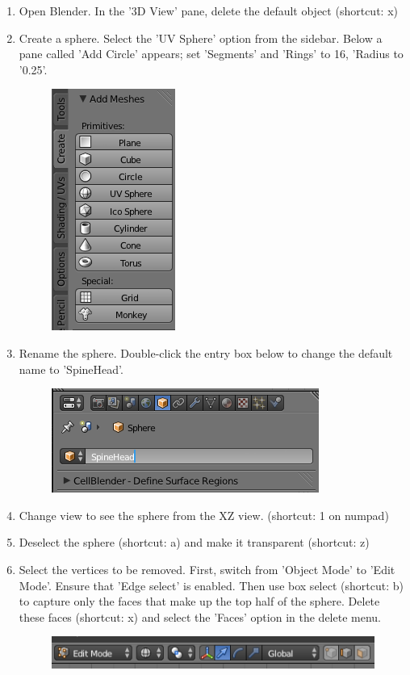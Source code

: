 \documentclass[twoside,a4paper]{refart}
\begin{document}
\begin{enumerate}

\item   Open Blender. In the '3D View' pane, delete the default object (shortcut: x)
    
\item   Create a sphere. Select the 'UV Sphere' option from the sidebar. Below a pane called 'Add Circle' appears; set 'Segments' and 'Rings' to 16, 'Radius to '0.25'. 
        \begin{figure}[H]
        \includegraphics[scale=0.5]{spinehead1.png}
        \end{figure}

\item   Rename the sphere. Double-click the entry box below to change the default name to 'SpineHead'.
        \begin{figure}[H]
        \includegraphics[scale=0.5]{spinehead2.png}
        \end{figure}

\item   Change view to see the sphere from the XZ view. (shortcut: 1 on numpad)

\item   Deselect the sphere (shortcut: a) and make it transparent (shortcut: z)

\item   Select the vertices to be removed. First, switch from 'Object Mode' to 'Edit Mode'. Ensure that 'Edge select' is enabled. Then use box select (shortcut: b) to capture only the faces that make up the top half of the sphere. Delete these faces (shortcut: x) and select the 'Faces' option in the delete menu.
        \begin{figure}[H]
        \includegraphics[scale=0.5]{spinehead3.png}
        \end{figure}


\end{enumerate}
\end{document}
